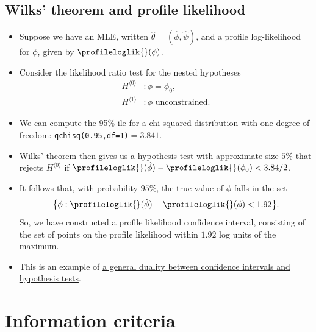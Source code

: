 \documentclass[
  letterpaper,
  DIV=11,
  numbers=noendperiod]{scrartcl}
\providecommand{\tightlist}{%
  \setlength{\itemsep}{0pt}\setlength{\parskip}{0pt}}\usepackage{longtable,booktabs,array}
\begin{document}
\hypertarget{wilks-theorem-and-profile-likelihood}{%
\subsection{Wilks' theorem and profile
likelihood}\label{wilks-theorem-and-profile-likelihood}}

\begin{itemize}
\tightlist
\item
  Suppose we have an MLE, written \(\hat\theta=(\hat\phi,\hat\psi)\),
  and a profile log-likelihood for \(\phi\), given by
  \(\profileloglik{{}}(\phi)\).
\item
  Consider the likelihood ratio test for the nested hypotheses
  \begin{equation*}
    \begin{aligned}
      H^{\langle 0\rangle} &: \phi = \phi_0, \\
      H^{\langle 1\rangle} &: \text{$\phi$ unconstrained}.
    \end{aligned}
  \end{equation*}
\item
  We can compute the 95\%-ile for a chi-squared distribution with one
  degree of freedom: \texttt{qchisq(0.95,df=1)}\(=3.841\).
\item
  Wilks' theorem then gives us a hypothesis test with approximate size
  \(5\%\) that rejects \(H^{\langle 0\rangle}\) if
  \(\profileloglik{{}}(\hat\phi)-\profileloglik{{}}(\phi_0)<3.84/2\).
\item
  It follows that, with probability \(95\%\), the true value of \(\phi\)
  falls in the set \begin{equation*}
    \big\{\phi: \profileloglik{{}}(\hat\phi)-\profileloglik{{}}(\phi)<1.92\big\}.
  \end{equation*} So, we have constructed a profile likelihood
  confidence interval, consisting of the set of points on the profile
  likelihood within \(1.92\) log units of the maximum.
\item
  This is an example of
  \href{https://www.stat.nus.edu.sg/~wloh/lecture17.pdf}{a general
  duality between confidence intervals and hypothesis tests}.
\end{itemize}

\hypertarget{information-criteria}{%
\section{Information criteria}\label{information-criteria}}
\end{document}
